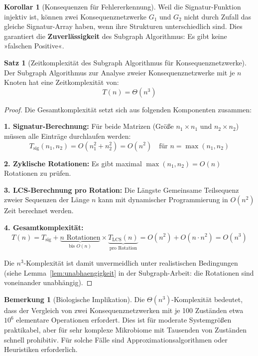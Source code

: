 \documentclass[a4paper,12pt]{article}
\theoremstyle{definition}
\newtheorem{satz}{Satz}
\newtheorem{bemerkung}{Bemerkung}
\newtheorem{korollar}{Korollar}
\begin{document}
\begin{korollar}[Konsequenzen für Fehlererkennung]
\label{kor:fehler}
Weil die Signatur-Funktion injektiv ist, können zwei Konsequenznetzwerke $G_1$ und $G_2$ nicht durch Zufall das gleiche Signatur-Array haben, wenn ihre Strukturen unterschiedlich sind. Dies garantiert die \textbf{Zuverlässigkeit} des Subgraph Algorithmus: Es gibt keine »falschen Positive«.
\end{korollar}

\begin{satz}[Zeitkomplexität des Subgraph Algorithmus für Konsequenznetzwerke]
\label{satz:zeitkomplexitaet}
Der Subgraph Algorithmus zur Analyse zweier Konsequenznetzwerke mit je $n$ Knoten hat eine Zeitkomplexität von:
\[
T(n) = \Theta(n^3)
\]
\end{satz}

\begin{proof}
Die Gesamtkomplexität setzt sich aus folgenden Komponenten zusammen:

\textbf{1. Signatur-Berechnung:}
Für beide Matrizen (Größe $n_1 \times n_1$ und $n_2 \times n_2$) müssen alle Einträge durchlaufen werden:
\[
T_{\text{sig}}(n_1, n_2) = O(n_1^2 + n_2^2) = O(n^2) \quad \text{für } n = \max(n_1, n_2)
\]

\textbf{2. Zyklische Rotationen:}
Es gibt maximal $\max(n_1, n_2) = O(n)$ Rotationen zu prüfen.

\textbf{3. LCS-Berechnung pro Rotation:}
Die Längste Gemeinsame Teilsequenz zweier Sequenzen der Länge $n$ kann mit dynamischer Programmierung in $O(n^2)$ Zeit berechnet werden.

\textbf{4. Gesamtkomplexität:}
\[
T(n) = T_{\text{sig}} + \underbrace{n \text{ Rotationen}}_{\text{bis } O(n)} \times \underbrace{T_{\text{LCS}}(n)}_{\text{pro Rotation}} = O(n^2) + O(n \cdot n^2) = O(n^3)
\]

Die $n^3$-Komplexität ist damit unvermeidlich unter realistischen Bedingungen (siehe Lemma~\ref{lem:unabhaengigkeit} in der Subgraph-Arbeit: die Rotationen sind voneinander unabhängig).
\end{proof}

\begin{bemerkung}[Biologische Implikation]
Die $\Theta(n^3)$-Komplexität bedeutet, dass der Vergleich von zwei Konsequenznetzwerken mit je 100 Zuständen etwa $10^6$ elementare Operationen erfordert. Dies ist für moderate Systemgrößen praktikabel, aber für sehr komplexe Mikrobiome mit Tausenden von Zuständen schnell prohibitiv. Für solche Fälle sind Approximationsalgorithmen oder Heuristiken erforderlich.
\end{bemerkung}
\end{document}
